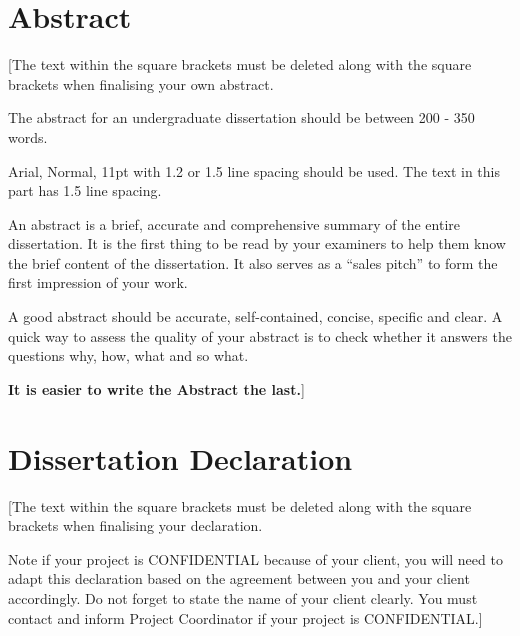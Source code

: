 \titleformat{\chapter}[hang]
    {\normalfont\Huge\bfseries}{\chaptertitlename\ \thechapter\ -\ }{0pt}{\Huge}
\titlespacing*{\chapter}{0pt}{0pt}{20pt}



\chapter*{Abstract}
\thispagestyle{fancy} %

[The text within the square brackets must be deleted along with the square brackets when finalising your own abstract. 

The abstract for an undergraduate dissertation should be between 200 - 350 words.

Arial, Normal, 11pt with 1.2 or 1.5 line spacing should be used. The text in this part has 1.5 line spacing.

An abstract is a brief, accurate and comprehensive summary of the entire dissertation. It is the first thing to be read by your examiners to help them know the brief content of the dissertation. It also serves as a “sales pitch” to form the first impression of your work. 

A good abstract should be accurate, self-contained, concise, specific and clear. A quick way to assess the quality of your abstract is to check whether it answers the questions why, how, what and so what.

\textbf{It is easier to write the Abstract the last.}]





\chapter*{Dissertation Declaration}
\thispagestyle{fancy} %

\color{red}
[The text within the square brackets must be deleted along with the square brackets when finalising your declaration.

Note if your project is CONFIDENTIAL because of your client, you will need to adapt this declaration based on the agreement between you and your client accordingly. Do not forget to state the name of your client clearly. You must contact and inform Project Coordinator if your project is CONFIDENTIAL.]
\color{black}

